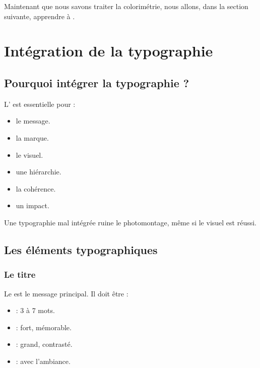 Maintenant que nous savons traiter la colorimétrie, nous allons, dans la section suivante, apprendre à .

\section{Intégration de la typographie}

\subsection{Pourquoi intégrer la typographie ?}

L' est essentielle pour :

\begin{itemize}
    \item {} le message.
    \item {} la marque.
    \item {} le visuel.
    \item {} une hiérarchie.
    \item {} la cohérence.
    \item {} un impact.
\end{itemize}

Une typographie mal intégrée ruine le photomontage, même si le visuel est réussi.

\subsection{Les éléments typographiques}

\subsubsection{Le titre}

Le  est le message principal. Il doit être :

\begin{itemize}
    \item {} : 3 à 7 mots.
    \item {} : fort, mémorable.
    \item {} : grand, contrasté.
    \item {} : avec l'ambiance.
\end{itemize}

